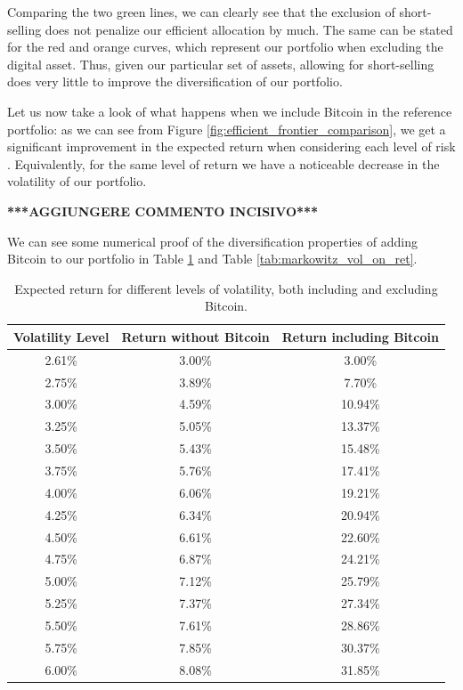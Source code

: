 Comparing the two green lines, we can clearly see that the exclusion of short-selling does not penalize our efficient allocation by much. The same can be stated for the red and orange curves, which represent our portfolio when excluding the digital asset.
Thus, given our particular set of assets, allowing for short-selling does very little to improve the diversification of our portfolio.

Let us now take a look of what happens when we include Bitcoin in the reference portfolio: as we can see from Figure \ref{fig:efficient_frontier_comparison}, we get a significant improvement in the expected return when considering each level of risk . Equivalently, for the same level of return we have a noticeable decrease in the volatility of our portfolio.

\textbf{***AGGIUNGERE COMMENTO INCISIVO***}

We can see some numerical proof of the diversification properties of adding Bitcoin to our portfolio in Table \ref{tab:markowitz_ret_on_vol} and Table	\ref{tab:markowitz_vol_on_ret}.

\begin{table}
	\small
	\centering
	\caption[Markowitz efficient frontier on volatility]{Expected return for different levels of volatility, both including and excluding Bitcoin.}
	\label{tab:markowitz_ret_on_vol}
\begin{tabular}{ccc}

Volatility Level & Return without Bitcoin & Return including Bitcoin \\
\midrule
2.61\% & 3.00\% & 3.00\% \\
2.75\% & 3.89\% & 7.70\% \\
3.00\% & 4.59\% & 10.94\% \\
3.25\% & 5.05\% & 13.37\% \\
3.50\% & 5.43\% & 15.48\% \\
3.75\% & 5.76\% & 17.41\% \\
4.00\% & 6.06\% & 19.21\% \\
4.25\% & 6.34\% & 20.94\% \\
4.50\% & 6.61\% & 22.60\% \\
4.75\% & 6.87\% & 24.21\% \\
5.00\% & 7.12\% & 25.79\% \\
5.25\% & 7.37\% & 27.34\% \\
5.50\% & 7.61\% & 28.86\% \\
5.75\% & 7.85\% & 30.37\% \\
6.00\% & 8.08\% & 31.85\% \\
\midrule
\end{tabular}
\end{table}

